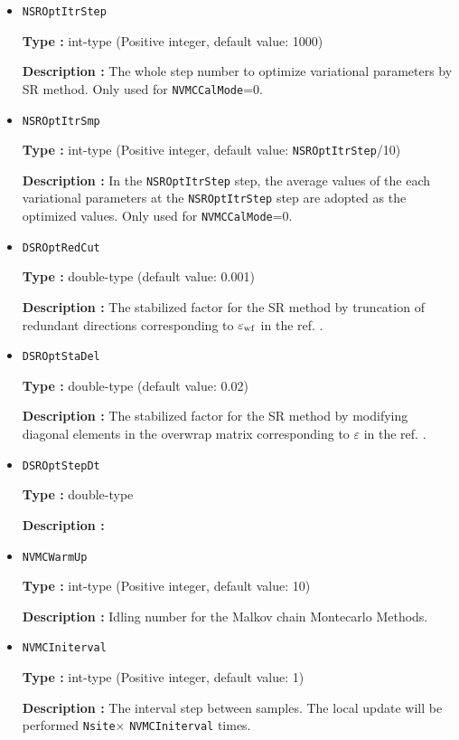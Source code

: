 \begin{itemize}
 \item  \verb|NSROptItrStep|

{\bf Type :} int-type (Positive integer, default value: 1000)

{\bf Description :} 
The whole step number to optimize variational parameters by SR method. Only used for \verb|NVMCCalMode|=0.
 
 \item  \verb|NSROptItrSmp|

{\bf Type :} int-type (Positive integer, default value: \verb|NSROptItrStep|/10)

{\bf Description :} In the \verb|NSROptItrStep| step, the average values of the each variational parameters at the \verb|NSROptItrStep| step are adopted as the optimized values. Only used for \verb|NVMCCalMode|=0.

\item   \verb|DSROptRedCut|
   
{\bf Type :} double-type (default value: 0.001)

{\bf Description :} The stabilized factor for the SR method by truncation of redundant directions corresponding to $\varepsilon_{\rm wf}$ in the ref. \cite{doi:10.1143/JPSJ.77.114701}.

 \item  \verb|DSROptStaDel| 
   
 {\bf Type :} double-type (default value: 0.02)

  {\bf Description :} The stabilized factor for the SR method by modifying diagonal elements in the overwrap matrix corresponding to $\varepsilon$ in the ref. \cite{doi:10.1143/JPSJ.77.114701}.
     
\item \verb|DSROptStepDt|

{\bf Type :} double-type 

{\bf Description :} 
 
\item \verb|NVMCWarmUp|

{\bf Type :} int-type (Positive integer, default value: 10)

{\bf Description :} Idling number for the Malkov chain Montecarlo Methods.

\item \verb|NVMCIniterval|

{\bf Type :} int-type (Positive integer, default value: 1)

{\bf Description :} The interval step between samples. The local update will be performed \verb|Nsite|× \verb|NVMCIniterval| times.


\end{itemize}
